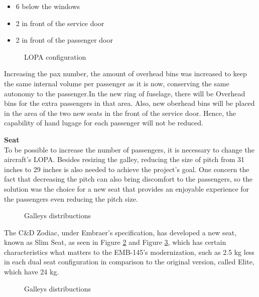 \begin{itemize}
  \item 6 below the windows
  \item 2 in front of the service door
  \item 2 in front of the passenger door
\end{itemize}

\begin{figure}[H] %
\caption{LOPA configuration}
\label{fig:LOPA}
\end{figure}

Increasing the pax number, the amount of overhead bins was increased to keep the same internal volume per passenger as it is now, conserving the same autonomy to the passenger.In the new ring of fuselage, there will be Overhead bins for the extra passengers in that area. Also, new oberhead bins will be placed in the area of the two new seats in the front of the service door. Hence, the capability of hand lugage for each passenger will not be reduced.
 

\textbf{Seat}
\\
To be possible to increase the number of passengers, it is necessary to change the aircraft's LOPA. Besides resizing the galley, reducing the size of pitch from 31 inches to 29 inches is also needed to achieve the project's goal. One concern the fact that decreasing the pitch can also bring discomfort to the passengers, so the solution was the choice for a new seat that provides an enjoyable experience for the passengers even reducing the pitch size.

\begin{figure}[H]
\caption{Galleys distribuctions}
\label{fig:slimseatisometric}
\end{figure}

The C\&D Zodiac, under Embraer's specification, has developed a new seat, known as Slim Seat, as seen in Figure \ref{fig:slimseatisometric} and Figure \ref{fig:slimseatside}, which has certain characteristics what matters to the EMB-145's modernization, such as 2.5 kg less in each dual seat configuration in comparison to the original version, called Elite, which have 24 kg.

\begin{figure}[H]
\caption{Galleys distribuctions}
\label{fig:slimseatside}
\end{figure}

